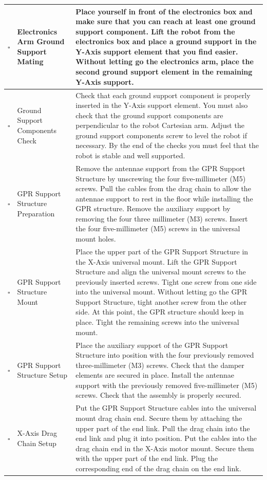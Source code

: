 \documentclass{article}
\begin{document}
\begin{onehalfspacing}
\begin{xltabular}{\textwidth}{|c|p{4cm}|X|}
    $\square$ & Electronics Arm Ground Support Mating & Place yourself in front of the electronics box and make sure that you can reach at least one ground support component. Lift the robot from the electronics box and place a ground support in the Y-Axis support element that you find easier. Without letting go the electronics arm, place the second ground support element in the remaining Y-Axis support. \\ \hline
    $\square$ & Ground Support Components Check & Check that each ground support component is properly inserted in the Y-Axis support element. You must also check that the ground support components are perpendicular to the robot Cartesian arm. Adjust the ground support components screw to level the robot if necessary. By the end of the checks you must feel that the robot is stable and well supported. \\ \hline
    $\square$ & GPR Support Structure Preparation & Remove the antennae support from the GPR Support Structure by unscrewing the four five-millimeter (M5) screws. Pull the cables from the drag chain to allow the antennae support to rest in the floor while installing the GPR structure. Remove the auxiliary support by removing the four three millimeter (M3) screws. Insert the four five-millimeter (M5) screws in the universal mount holes.  \\ \hline
    $\square$ & GPR Support Structure Mount & Place the upper part of the GPR Support Structure in the X-Axis universal mount. Lift the GPR Support Structure and align the universal mount screws to the previously inserted screws. Tight one screw from one side into the universal mount. Without letting go the GPR Support Structure, tight another screw from the other side. At this point, the GPR structure should keep in place. Tight the remaining screws into the universal mount. \\ \hline
    $\square$ & GPR Support Structure Setup & Place the auxiliary support of the GPR Support Structure into position with the four previously removed three-millimeter (M3) screws. Check that the damper elements are secured in place. Install the antennae support with the previously removed five-millimeter (M5) screws. Check that the assembly is properly secured. \\ \hline
    $\square$ & X-Axis Drag Chain Setup & Put the GPR Support Structure cables into the universal mount drag chain end. Secure them by attaching the upper part of the end link. Pull the drag chain into the end link and plug it into position. Put the cables into the drag chain end in the X-Axis motor mount. Secure them with the upper part of the end link. Plug the corresponding end of the drag chain on the end link. \\ \hline

\end{xltabular}
\end{onehalfspacing}
\end{document}
